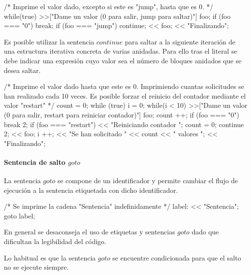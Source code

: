 \begin{myverbatim}
   /*
      Imprime el valor dado,
      excepto si este es "jump",
      hasta que es 0.
   */
  while(true){
    >>["Dame un valor (0 para salir, jump para saltar)"] foo;
    if (foo === "0")
      break;
   if (foo === "jump")
      continue;
   << foo;
  }
  << "Finalizando";
\end{myverbatim}

Es posible utilizar la sentencia $continue$ para saltar a la siguiente iteración de una estructura iterativa concreta de varias anidadas. Para ello tras el literal 
se debe indicar una expresión cuyo valor sea el número de bloques anidados que se desea saltar. \\

\begin{myverbatim}
   /*
      Imprime el valor dado hasta que este es 0.
      Imprimiendo cuantas solicitudes se han realizado cada 10 veces.
      Es posible forzar el reinicio del contador mediante el valor "restart"
   */
   count = 0;
   while (true) {
     i = 0;
     while(i < 10){
       >>["Dame un valor (0 para salir, restart para reiniciar contador)"] foo;
       count ++;
       if (foo === "0")
         break 2;
       if (foo === "restart"){
         << "Reiniciando contador ";
         count = 0;
         continue 2;
       }
       << foo;
       i ++;
     }
     << "Se han solicitado " << count << " valores ";
   }
  << "Finalizando";
\end{myverbatim} 

\paragraph{Sentencia de salto $goto$} \label{sec:stmt_goto}
La sentencia $goto$ se compone de un identificador y  permite cambiar el flujo de ejecución a la sentencia etiquetada con dicho identificador. \\

\begin{myverbatim}
   /*
      Se imprime la cadena
      "Sentencia" indefinidamente
   */
   label: << "Sentencia";
   goto label;
\end{myverbatim}

En general se desaconseja el uso de etiquetas y sentencias $goto$ dado que dificultan la legibilidad del código.

Lo habitual es que la sentencia $goto$ se encuentre condicionada para que el salto no se ejecute siempre. \\

